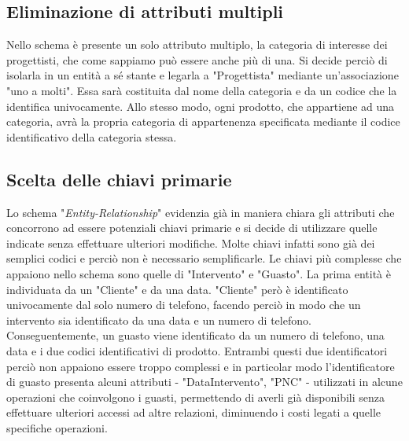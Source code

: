 \documentclass[a4paper, 12pt]{report}
\begin{document}
\subsection{Eliminazione di attributi multipli}

Nello schema è presente un solo attributo multiplo, la categoria di interesse dei progettisti, che come sappiamo può essere anche più di una. Si decide perciò di isolarla in
un entità a sé stante e legarla a "Progettista" mediante un'associazione "uno a molti". Essa sarà costituita dal nome della categoria e da un codice che la identifica univocamente.
Allo stesso modo, ogni prodotto, che appartiene ad una categoria, avrà la propria categoria di appartenenza specificata mediante il codice identificativo della categoria stessa.

\subsection{Scelta delle chiavi primarie}

Lo schema "\textit{Entity-Relationship}" evidenzia già in maniera chiara gli attributi che concorrono ad essere potenziali chiavi primarie e si decide di utilizzare quelle
indicate senza effettuare ulteriori modifiche. Molte chiavi infatti sono già dei semplici codici e perciò non è necessario semplificarle. Le chiavi più complesse che appaiono nello
schema sono quelle di "Intervento" e "Guasto". La prima entità è individuata da un "Cliente" e da una data. "Cliente" però è identificato univocamente dal solo numero di telefono,
facendo perciò in modo che un intervento sia identificato da una data e un numero di telefono. Conseguentemente, un guasto viene identificato da un numero di telefono, una data e i
due codici identificativi di prodotto. Entrambi questi due identificatori perciò non appaiono essere troppo complessi e in particolar modo l'identificatore di guasto presenta alcuni
attributi - "DataIntervento", "PNC" - utilizzati in alcune operazioni che coinvolgono i guasti, permettendo di averli già disponibili senza effettuare ulteriori accessi ad altre relazioni,
diminuendo i costi legati a quelle specifiche operazioni.
\end{document}

